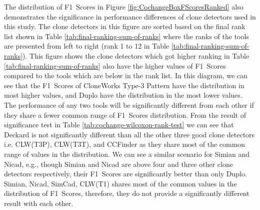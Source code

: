 \documentclass[review]{elsarticle}
\begin{document}
The distribution of F1~Scores in Figure \ref{fig:CochangeBoxFScoresRanked} also demonstrates the significance in performance differences of clone detectors used in this study. The clone detectors in this figure are sorted based on the final rank list shown in Table \ref{tab:final-ranking-sum-of-ranks} where the ranks of the tools are presented from left to right (rank 1 to 12 in Table \ref{tab:final-ranking-sum-of-ranks}). This figure shows the clone detectors which got higher ranking in Table \ref{tab:final-ranking-sum-of-ranks} also have the higher values of F1~Scores compared to the tools which are below in the rank list. In this diagram, we can see that the F1~Scores of CloneWorks Type-3 Pattern have the distribution in most higher values, and Duplo have the distribution in the most lower values. The performance of any two tools will be significantly different from each other if they share a fewer common range of F1~Scores distribution. From the result of significance test in Table \ref{tab:cochange-wilcoxon-rank-test} we can see that Deckard is not significantly different than all the other three good clone detectors i.e. CLW(T3P), CLW(T3T), and CCFinder as they share most of the common range of values in the distribution. We can see a similar scenario for Simian and Nicad, e.g., though Simian and Nicad are above four and three other clone detectors respectively, their F1~Scores are significantly better than only Duplo. Simian, Nicad, SimCad, CLW(T1) shares most of the common values in the distribution of F1~Scores, therefore, they do not provide a significantly different result with each other. 
\end{document}
